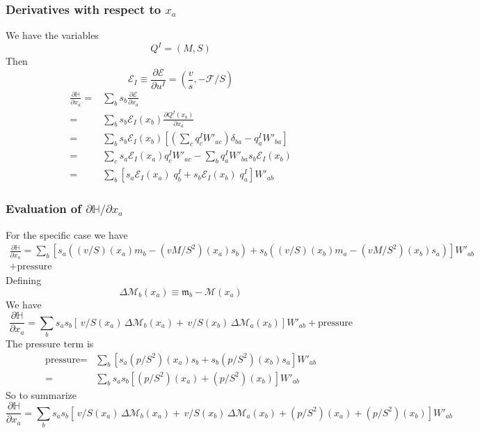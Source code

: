 \documentclass[12pt,aps,preprint,nofootinbib,noshowkeys,noshowpacs,longbibliography,superscriptaddress,tightenlines]{revtex4-2}
\def\F{{\mathcal F}}
\def\st{\begin{equation}}
\def\stp{\end{equation}}
\def\E{{\mathcal E}}
\def\M{{\mathcal M}}
\def\m{{\mathfrak m}}
\begin{document}
\subsubsection{\texorpdfstring{Derivatives with respect to $x_a$}{Derivatives with respect to x\_a}}
We have the variables 
\st
 Q^I =  (M, S)
\stp
Then 
\st
\E_I \equiv \frac{\partial \E}{\partial u^I} =  (\frac{v}{s} ,  -\F/S)
\stp
\begin{align}
    \frac{\partial \mathbb H}{\partial x_a } =& \sum_b s_b \frac{\partial \E}{\partial x_a} \\
    =& \sum_{b} s_b \E_I(x_b) \frac{\partial Q^I(x_b)}{\partial x_a}  \\
    =& \sum_b s_b\E_I(x_b) \left[  (\sum_c q_c^I W'_{ac}) \delta_{ba} -  q_a^I W'_{ba}  \right]   \\
    =& \sum_{c} s_a \E_I(x_a) q^I_c W'_{ac}   - \sum_{b} q_a^I W'_{ba} s_b \E_I(x_b)  \\
    =& \sum_{b}  \left[ s_a \E_I(x_a) \; q^I_{b} + s_b \E_I(x_b) \; q_a^I \right] W'_{ab}
\end{align}

\subsubsection{\texorpdfstring{Evaluation of $\partial \mathbb H/\partial x_a$}{Evaluation of dH/dx\_a}}
For the specific case we have 
\begin{multline}
   \frac{\partial \mathbb H}{\partial x_a} = 
   \sum_{b} \left[  s_a\left( (v/S)(x_a) m_b -  (vM/S^2)(x_a)s_b \right) + s_b \left( (v/S)(x_b) m_a -  (vM/S^2)(x_b) s_a  \right) \right]  W'_{ab} \\ + \mbox{pressure}
\end{multline}
Defining 
\st
 \Delta \M_b(x_a) \equiv \m_b -  \M(x_a) 
\stp
We have
\st
   \frac{\partial \mathbb H}{\partial x_a} = 
   \sum_{b}   s_a s_b \left[   \, v/S(x_a) \, \Delta \M_b(x_a) +  \, v/S(x_b)\,  \Delta \M_a(x_b) \right]  W'_{ab} + \mbox{pressure}
\stp
The pressure term is 
\begin{align}
    \mbox{pressure} =& 
    \sum_{b} \left[ s_a (p/S^2)(x_a) s_b + s_b (p/S^2)(x_b) s_a \right] W'_{ab} \\
    =& 
    \sum_{b} s_a s_b \left[  (p/S^2)(x_a) +  (p/S^2)(x_b) \right] W'_{ab}  
\end{align}
So to summarize 
\st
\frac{\partial \mathbb H}{\partial x_a} = 
\sum_{b}   s_a s_b \left[   \, v/S(x_a) \, \Delta \M_b(x_a) +  \, v/S(x_b)\,  \Delta \M_a(x_b)  +  (p/S^2)(x_a) + (p/S^2)(x_b) \right]  W'_{ab} 
\stp
\end{document}

